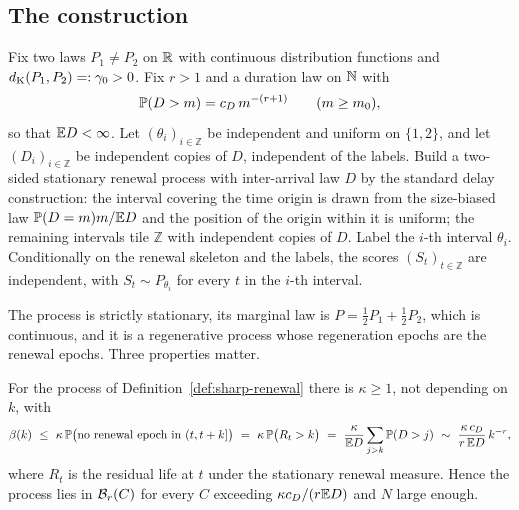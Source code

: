 \documentclass[../../../main.tex]{subfiles}
\begin{document}
\subsection{The construction}

\begin{definition}\label{def:sharp-renewal}
Fix two laws $P_1\ne P_2$ on $\mathbb{R}$ with continuous distribution functions and $d_{\mathrm{K}}(P_1,P_2)=:\gamma_0>0$. Fix $r>1$ and a duration law on $\mathbb{N}$ with
\[
\mathbb{P}(D>m)=c_D\,m^{-(r+1)}\qquad(m\ge m_0),
\]
so that $\mathbb{E} D<\infty$. Let $(\theta_i)_{i\in\mathbb Z}$ be independent and uniform on $\{1,2\}$, and let $(D_i)_{i\in\mathbb Z}$ be independent copies of $D$, independent of the labels. Build a two-sided stationary renewal process with inter-arrival law $D$ by the standard delay construction: the interval covering the time origin is drawn from the size-biased law $\mathbb{P}(D=m)m/\mathbb{E} D$ and the position of the origin within it is uniform; the remaining intervals tile $\mathbb Z$ with independent copies of $D$. Label the $i$-th interval $\theta_i$. Conditionally on the renewal skeleton and the labels, the scores $(S_t)_{t\in\mathbb Z}$ are independent, with $S_t\sim P_{\theta_i}$ for every $t$ in the $i$-th interval.
\end{definition}

The process is strictly stationary, its marginal law is $P=\tfrac12P_1+\tfrac12P_2$, which is continuous, and it is a regenerative process whose regeneration epochs are the renewal epochs. Three properties matter.

\begin{lemma}\label{lem:sharp-renewal-beta}
For the process of Definition~\ref{def:sharp-renewal} there is $\kappa\ge1$, not depending on $k$, with
\[
\beta(k)\ \le\ \kappa\,\Prob\big(\text{no renewal epoch in }(t,t+k]\big)\ =\ \kappa\,\Prob\big(R_t>k\big)
\ =\ \frac{\kappa}{\E D}\sum_{j>k}\Prob(D>j)\ \sim\ \frac{\kappa\,c_D}{r\,\E D}\,k^{-r},
\]
where $R_t$ is the residual life at $t$ under the stationary renewal measure. Hence the process lies in $\mathcal B_{r}(C)$ for every $C$ exceeding $\kappa c_D/(r\mathbb{E} D)$ and $N$ large enough.
\end{lemma}
\end{document}
